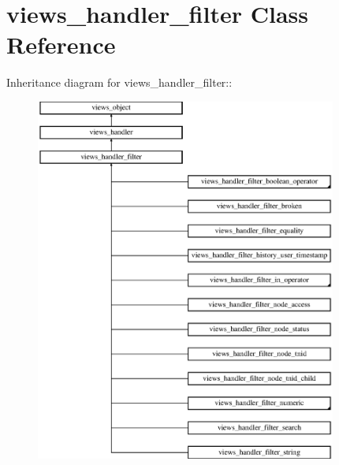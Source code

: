 \hypertarget{classviews__handler__filter}{
\section{views\_\-handler\_\-filter Class Reference}
\label{classviews__handler__filter}
}
Inheritance diagram for views\_\-handler\_\-filter::\begin{figure}[H]
\begin{center}
\leavevmode
\includegraphics[height=12cm]{classviews__handler__filter}
\end{center}
\end{figure}
